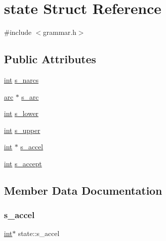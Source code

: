 \hypertarget{structstate}{}\section{state Struct Reference}
\label{structstate}


{\ttfamily \#include $<$grammar.\+h$>$}

\subsection*{Public Attributes}
\begin{DoxyCompactItemize}
\item 
\mbox{\hyperlink{warnings_8h_a74f207b5aa4ba51c3a2ad59b219a423b}{int}} \mbox{\hyperlink{structstate_ab40e0d7dcf6279c8d580b10c43c52bea}{s\+\_\+narcs}}
\item 
\mbox{\hyperlink{structarc}{arc}} $\ast$ \mbox{\hyperlink{structstate_a48dd0737c713d022f0a325bcf00720ac}{s\+\_\+arc}}
\item 
\mbox{\hyperlink{warnings_8h_a74f207b5aa4ba51c3a2ad59b219a423b}{int}} \mbox{\hyperlink{structstate_ac0e13c561d230dd73c96ae092fc8327d}{s\+\_\+lower}}
\item 
\mbox{\hyperlink{warnings_8h_a74f207b5aa4ba51c3a2ad59b219a423b}{int}} \mbox{\hyperlink{structstate_a2adaa9bfb5e4b5a4d6e5cf18eb45b35a}{s\+\_\+upper}}
\item 
\mbox{\hyperlink{warnings_8h_a74f207b5aa4ba51c3a2ad59b219a423b}{int}} $\ast$ \mbox{\hyperlink{structstate_adf0ca868ccf8aca5d98eef3fa333db3d}{s\+\_\+accel}}
\item 
\mbox{\hyperlink{warnings_8h_a74f207b5aa4ba51c3a2ad59b219a423b}{int}} \mbox{\hyperlink{structstate_a11c378b4839835db24f1b9be3785e6fb}{s\+\_\+accept}}
\end{DoxyCompactItemize}


\subsection{Member Data Documentation}
\mbox{\label{structstate_adf0ca868ccf8aca5d98eef3fa333db3d}} 
\subsubsection{\texorpdfstring{s\_accel}{s\_accel}}
{\footnotesize\ttfamily \mbox{\hyperlink{warnings_8h_a74f207b5aa4ba51c3a2ad59b219a423b}{int}}$\ast$ state\+::s\+\_\+accel}

